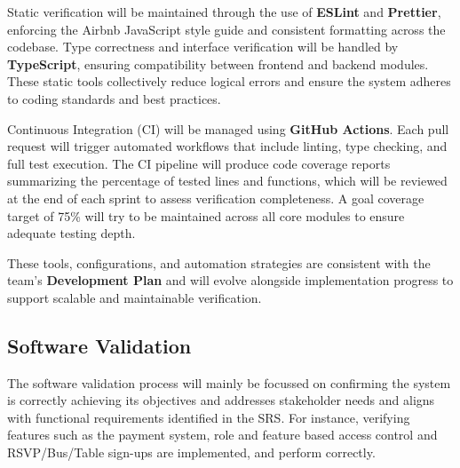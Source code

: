 \documentclass[12pt, titlepage]{article}
\begin{document}
Static verification will be maintained through the use of \textbf{ESLint} and \textbf{Prettier}, enforcing the Airbnb JavaScript style guide and consistent formatting across the codebase. Type correctness and interface verification will be handled by \textbf{TypeScript}, ensuring compatibility between frontend and backend modules. These static tools collectively reduce logical errors and ensure the system adheres to coding standards and best practices.

Continuous Integration (CI) will be managed using \textbf{GitHub Actions}. Each pull request will trigger automated workflows that include linting, type checking, and full test execution. The CI pipeline will produce code coverage reports summarizing the percentage of tested lines and functions, which will be reviewed at the end of each sprint to assess verification completeness. A goal coverage target of 75\% will try to be maintained across all core modules to ensure adequate testing depth.

These tools, configurations, and automation strategies are consistent with the team’s \textbf{Development Plan} and will evolve alongside implementation progress to support scalable and maintainable verification.

\subsection{Software Validation}
The software validation process will mainly be focussed on confirming the system is correctly achieving its objectives and addresses stakeholder needs and aligns with functional requirements identified in the SRS. For instance, verifying features such as the payment system, role and feature based access control and RSVP/Bus/Table sign-ups are implemented, and perform correctly. 
\end{document}
